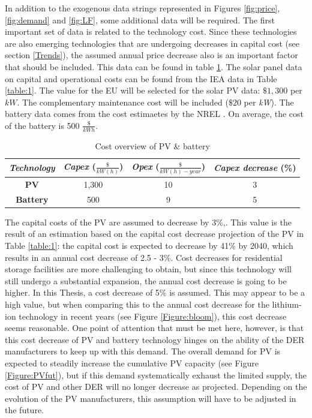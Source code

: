 \newline \newline \noindent
In addition to the exogenous data strings represented in Figures  \ref{fig:price}, \ref{fig:demand} and \ref{fig:LF}, some additional data will be required. The first important set of data is related to the technology cost. Since these technologies are also emerging technologies that are undergoing decreases in capital cost (see section \ref{Trends}), the assumed annual price decrease also is an important factor that should be included. This data can be found in table \ref{tab:PVbat}. The solar panel data on capital and operational costs can be found from the IEA data in Table \ref{table:1}. The value for the EU will be selected for the solar PV data: $\$1,300$ per $kW$.  The complementary maintenance cost will be included ($\$20$ per \textit{kW}). The battery data comes from the cost estimaetes by the NREL \cite{batdata}. On average, the cost of the battery is 500 $\frac{\$}{kWh}$.
\begin{table}[h!]
    \centering
    \begin{tabular}{||c|c|c|c||}
    \hline 
          \textit{\textbf{Technology}} & \textit{Capex} ($\frac{\$}{kW(h)}$) & \textit{Opex} ($\frac{\$}{kW(h)-year}$) & \textit{Capex decrease} (\%)\\
         \hline 
         \hline
          \textbf{\textbf{PV}} & 1,300 & 10 & 3\\
          \textbf{\textbf{Battery}} & 500 & 9 & 5\\
          \hline 
    \end{tabular}
    \caption{Cost overview of PV \& battery}
    \label{tab:PVbat}
\end{table}
The capital costs of the PV are assumed to decrease by 3\%,. This value is the result of an estimation based on the capital cost decrease projection of the PV in Table \ref{table:1}: the capital cost is expected to decrease by 41\% by 2040, which results in an annual cost decrease of 2.5 - 3\%. Cost decreases for residential storage facilities are more challenging to obtain, but since this technology will still undergo a substantial expansion, the annual cost decrease is going to be higher. In this Thesis, a cost decrease of 5\% is assumed. This may appear to be a high value, but when comparing this to the annual cost decrease for the lithium-ion technology in recent years (see Figure \ref{Figure:bloom}), this cost decrease seems reasonable. One point of attention that must be met here, however, is that this cost decrease of PV and battery technology hinges on the ability of the DER manufacturers to keep up with this demand. The overall demand for PV is expected to steadily increase the cumulative PV capacity (see Figure \ref{Figure:PVfut}), but if this demand systematically exhaust the limited supply, the cost of PV and other DER will no longer decrease as projected. Depending on the evolution of the PV manufacturers, this assumption will have to be adjusted in the future. 
